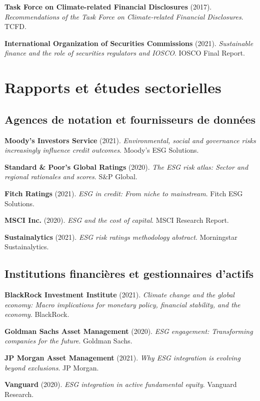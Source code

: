 \textbf{Task Force on Climate-related Financial Disclosures} (2017). \textit{Recommendations of the Task Force on Climate-related Financial Disclosures}. TCFD.

\textbf{International Organization of Securities Commissions} (2021). \textit{Sustainable finance and the role of securities regulators and IOSCO}. IOSCO Final Report.

\section{Rapports et études sectorielles}

\subsection{Agences de notation et fournisseurs de données}

\textbf{Moody's Investors Service} (2021). \textit{Environmental, social and governance risks increasingly influence credit outcomes}. Moody's ESG Solutions.

\textbf{Standard \& Poor's Global Ratings} (2020). \textit{The ESG risk atlas: Sector and regional rationales and scores}. S\&P Global.

\textbf{Fitch Ratings} (2021). \textit{ESG in credit: From niche to mainstream}. Fitch ESG Solutions.

\textbf{MSCI Inc.} (2020). \textit{ESG and the cost of capital}. MSCI Research Report.

\textbf{Sustainalytics} (2021). \textit{ESG risk ratings methodology abstract}. Morningstar Sustainalytics.

\subsection{Institutions financières et gestionnaires d'actifs}

\textbf{BlackRock Investment Institute} (2021). \textit{Climate change and the global economy: Macro implications for monetary policy, financial stability, and the economy}. BlackRock.

\textbf{Goldman Sachs Asset Management} (2020). \textit{ESG engagement: Transforming companies for the future}. Goldman Sachs.

\textbf{JP Morgan Asset Management} (2021). \textit{Why ESG integration is evolving beyond exclusions}. JP Morgan.

\textbf{Vanguard} (2020). \textit{ESG integration in active fundamental equity}. Vanguard Research.

